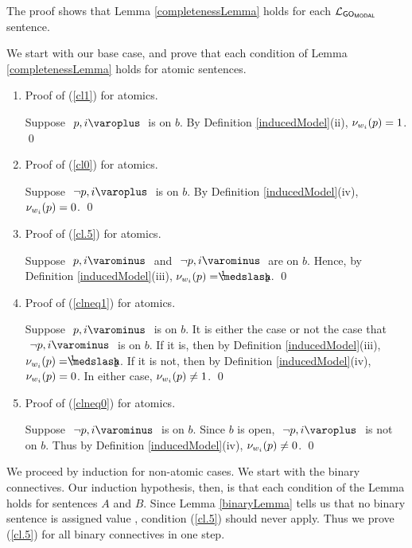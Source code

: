 \begin{proof*}
The proof shows that Lemma \ref{completenessLemma} holds for each $ \mathcal{L}_{\mathsf{GO}_{\mathsf{MODAL}}} $ sentence.

\noindent We start with our base case, and prove that each condition of Lemma \ref{completenessLemma} holds for atomic sentences.

\begin{enumerate}


	\item Proof of (\ref{cl1}) for atomics.
	 
		Suppose $ \like{ \dNodei{ p } } $ is on $ b $. 
		By Definition \ref{inducedModel}(ii), $ \mathcal{\nu}_{ w_i }({ p }) = 1 $.
		\qed
			
	\item Proof of (\ref{cl0}) for atomics.
	
		Suppose $ \like{ \dNodei{ \neg p }} $ is on $ b $.
		By Definition \ref{inducedModel}(iv), $ \mathcal{\nu}_{ w_i }({ p }) = 0 $.
		\qed
		
	\item Proof of (\ref{cl.5}) for atomics.
	
		Suppose $ \like{ \uNodei{ p } } $ and $ \like{ \uNodei{\neg p} } $ are on $ b $. 
		Hence, by Definition \ref{inducedModel}(iii), $ \Valwi{ p } = \oneHalf $.
		\qed

	\item Proof of (\ref{clneq1}) for atomics.
	
		Suppose $ \like{ \uNodei{ p }} $ is on $b$. It is either the case or not the case that $ \like{ \uNodei{ \neg p }} $ is on $b$. 
		If it is, then by Definition \ref{inducedModel}(iii), $ \Valwi{ p } = \oneHalf$.
		If it is not, then by Definition \ref{inducedModel}(iv), $ \mathcal{\nu}_{ w_i }({ p }) = 0 $.
		In either case, $ \mathcal{\nu}_{ w_i }({ p }) \neq 1 $.
		\qed

	\item Proof of (\ref{clneq0}) for atomics.
	
		Suppose $ \like{ \uNodei{ \neg p }} $ is on $b$.
		Since $b$ is open, $ \like{ \dNodei{ \neg p }} $ is not on $b$.
		Thus by Definition \ref{inducedModel}(iv), $ \mathcal{\nu}_{ w_i }({ p }) \neq 0 $.
		\qed

	\setcounter{enumi_saved}{\value{enumi}}
\end{enumerate}
We proceed by induction for non-atomic cases. We start with the binary connectives. Our induction hypothesis, then, is that each condition of the Lemma holds for sentences $A$ and $B$. Since Lemma \ref{binaryLemma} tells us that no binary sentence is assigned value \oneHalf, condition (\ref{cl.5}) should never apply. Thus we prove (\ref{cl.5}) for all binary connectives in one step. 


\end{proof*}
